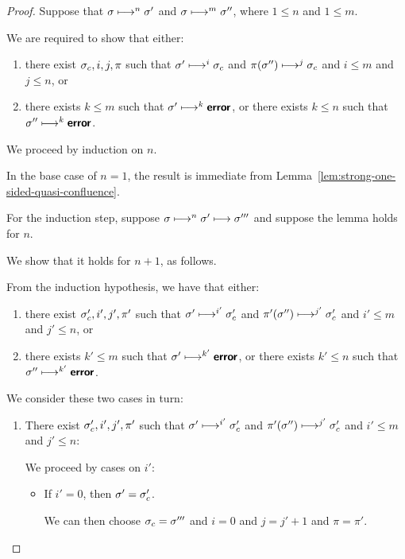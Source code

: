 \begin{proof}
  Suppose that $\sigma \longmapsto^n \sigma'$ and $\sigma \longmapsto^m
  \sigma''$, where $1 \leq n$ and $1 \leq m$.

  We are required to show that either:
  \begin{enumerate}
  \item there exist $\sigma_c, i, j, \pi$ such that $\sigma'
    \longmapsto^i \sigma_c$ and $\pi(\sigma'') \longmapsto^j \sigma_c$
    and $i \leq m$ and $j \leq n$, or
  \item there exists $k \leq m$ such that $\sigma' \longmapsto^k
    \textup{\ensuremath{\textbf{\textsf{error}}}}$, or there exists $k \leq n$ such that $\sigma''
    \longmapsto^k \textup{\ensuremath{\textbf{\textsf{error}}}}$.
  \end{enumerate}

  We proceed by induction on $n$.

  In the base case of $n = 1$, the result is immediate from
  Lemma~\ref{lem:strong-one-sided-quasi-confluence}.

  For the induction step, suppose $\sigma \longmapsto^n \sigma'
  \longmapsto \sigma'''$ and suppose the lemma holds for $n$.

  We show that it holds for $n + 1$, as follows.

  From the induction hypothesis, we have that either:
  \begin{enumerate}
  \item there exist $\sigma'_c, i', j', \pi'$ such that $\sigma'
    \longmapsto^{i'} \sigma'_c$ and $\pi'(\sigma'') \longmapsto^{j'}
    \sigma'_c$ and $i' \leq m$ and $j' \leq n$, or
  \item there exists $k' \leq m$ such that $\sigma' \longmapsto^{k'}
    \textbf{\textsf{error}}$, or there exists $k' \leq n$ such that $\sigma''
    \longmapsto^{k'} \textbf{\textsf{error}}$.
  \end{enumerate}

  We consider these two cases in turn:

  \begin{enumerate}
  \item There exist $\sigma'_c, i', j', \pi'$ such that $\sigma'
    \longmapsto^{i'} \sigma'_c$ and $\pi'(\sigma'') \longmapsto^{j'}
    \sigma'_c$ and $i' \leq m$ and $j' \leq n$:

    We proceed by cases on $i'$:
    \begin{itemize}

    \item If $i' = 0$, then $\sigma' = \sigma_c'$.

      We can then choose $\sigma_c = \sigma'''$ and $i = 0$ and $j = j'
      + 1$ and $\pi = \pi'$.


\end{itemize}
\end{enumerate}
\end{proof}
